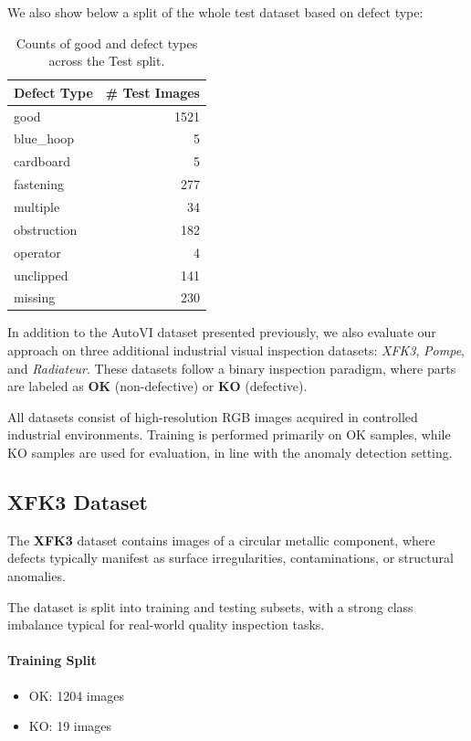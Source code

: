 \documentclass{article}
\begin{document}
We also show below a split of the whole test dataset based on defect type:

\begin{table}[htbp]
    \centering
    \begin{tabular}{l r}
        \hline
        \textbf{Defect Type} & \textbf{\# Test Images} \\
        \hline
        good         & 1521 \\
        blue\_hoop    & 5 \\
        cardboard     & 5 \\
        fastening     & 277 \\
        multiple      & 34 \\
        obstruction   & 182 \\
        operator      & 4 \\
        unclipped     & 141 \\
        missing       & 230 \\
        \hline
    \end{tabular}
    \caption{Counts of good and defect types across the Test split.}
    \label{tab:defects_test_split}
\end{table}

In addition to the AutoVI dataset presented previously, we also evaluate our approach on three additional industrial visual inspection datasets: \textit{XFK3}, \textit{Pompe}, and \textit{Radiateur}.
These datasets follow a binary inspection paradigm, where parts are labeled as \textbf{OK} (non-defective) or \textbf{KO} (defective).

All datasets consist of high-resolution RGB images acquired in controlled industrial environments.
Training is performed primarily on OK samples, while KO samples are used for evaluation, in line with the anomaly detection setting.

\subsection{XFK3 Dataset}

The \textbf{XFK3} dataset contains images of a circular metallic component, where defects typically manifest as surface irregularities, contaminations, or structural anomalies.

The dataset is split into training and testing subsets, with a strong class imbalance typical for real-world quality inspection tasks.

\paragraph{Training Split}
\begin{itemize}
    \item OK: 1204 images
    \item KO: 19 images
\end{itemize}
\end{document}
